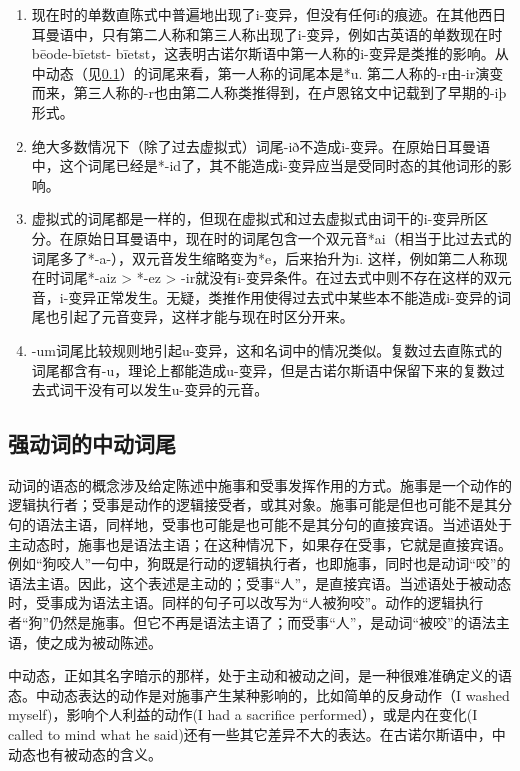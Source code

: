 \begin{enumerate}
  \def\labelenumi{\arabic{enumi})}
  \item
        现在时的单数直陈式中普遍地出现了i-变异，但没有任何i的痕迹。在其他西日耳曼语中，只有第二人称和第三人称出现了i-变异，例如古英语的单数现在时bēode-bīetst-
        bīetst，这表明古诺尔斯语中第一人称的i-变异是类推的影响。从中动态（见\ref{强动词的中动词尾}）的词尾来看，第一人称的词尾本是*u.
        第二人称的-r由-ir演变而来，第三人称的-r也由第二人称类推得到，在卢恩铭文中记载到了早期的-iþ形式。
  \item
        绝大多数情况下（除了过去虚拟式）词尾-ið不造成i-变异。在原始日耳曼语中，这个词尾已经是*-id了，其不能造成i-变异应当是受同时态的其他词形的影响。
  \item
        \label{_Ref116919964}{}虚拟式的词尾都是一样的，但现在虚拟式和过去虚拟式由词干的i-变异所区分。在原始日耳曼语中，现在时的词尾包含一个双元音*ai（相当于比过去式的词尾多了*-a-），双元音发生缩略变为*e，后来抬升为i.
        这样，例如第二人称现在时词尾*-aiz \textgreater{} *-ez \textgreater{}
        -ir就没有i-变异条件。在过去式中则不存在这样的双元音，i-变异正常发生。无疑，类推作用使得过去式中某些本不能造成i-变异的词尾也引起了元音变异，这样才能与现在时区分开来。
  \item
        -um词尾比较规则地引起u-变异，这和名词中的情况类似。复数过去直陈式的词尾都含有-u，理论上都能造成u-变异，但是古诺尔斯语中保留下来的复数过去式词干没有可以发生u-变异的元音。
\end{enumerate}

\subsection{强动词的中动词尾}\label{强动词的中动词尾}

动词的语态的概念涉及给定陈述中施事和受事发挥作用的方式。施事是一个动作的逻辑执行者；受事是动作的逻辑接受者，或其对象。施事可能是但也可能不是其分句的语法主语，同样地，受事也可能是也可能不是其分句的直接宾语。当述语处于主动态时，施事也是语法主语；在这种情况下，如果存在受事，它就是直接宾语。例如``狗咬人''一句中，狗既是行动的逻辑执行者，也即施事，同时也是动词``咬''的语法主语。因此，这个表述是主动的；受事``人''，是直接宾语。当述语处于被动态时，受事成为语法主语。同样的句子可以改写为``人被狗咬''。动作的逻辑执行者``狗''仍然是施事。但它不再是语法主语了；而受事``人''，是动词``被咬''的语法主语，使之成为被动陈述。

中动态，正如其名字暗示的那样，处于主动和被动之间，是一种很难准确定义的语态。中动态表达的动作是对施事产生某种影响的，比如简单的反身动作（I
washed myself‌)，影响个人利益的动作(I had a sacrifice
performed），或是内在变化(I called to mind what he
said)还有一些其它差异不大的表达。在古诺尔斯语中，中动态也有被动态的含义。

